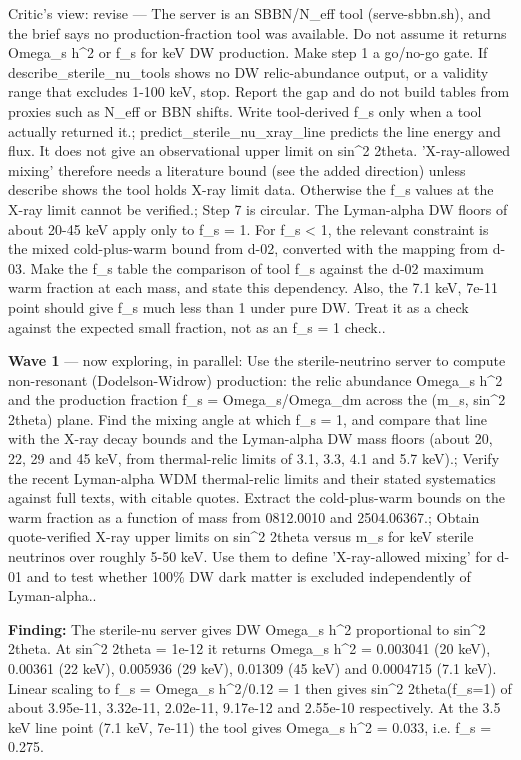 \documentclass[11pt,a4paper]{article}
\begin{document}
\begin{enumerate}
Critic's view: revise --- The server is an SBBN/N\_eff tool (serve-sbbn.sh), and the brief says no production-fraction tool was available. Do not assume it returns Omega\_s h\textasciicircum{}2 or f\_s for keV DW production. Make step 1 a go/no-go gate. If describe\_sterile\_nu\_tools shows no DW relic-abundance output, or a validity range that excludes 1-100 keV, stop. Report the gap and do not build tables from proxies such as N\_eff or BBN shifts. Write tool-derived f\_s only when a tool actually returned it.; predict\_sterile\_nu\_xray\_line predicts the line energy and flux. It does not give an observational upper limit on sin\textasciicircum{}2 2theta. 'X-ray-allowed mixing' therefore needs a literature bound (see the added direction) unless describe shows the tool holds X-ray limit data. Otherwise the f\_s values at the X-ray limit cannot be verified.; Step 7 is circular. The Lyman-alpha DW floors of about 20-45 keV apply only to f\_s = 1. For f\_s \textless{} 1, the relevant constraint is the mixed cold-plus-warm bound from d-02, converted with the mapping from d-03. Make the f\_s table the comparison of tool f\_s against the d-02 maximum warm fraction at each mass, and state this dependency. Also, the 7.1 keV, 7e-11 point should give f\_s much less than 1 under pure DW. Treat it as a check against the expected small fraction, not as an f\_s = 1 check..

\end{enumerate}
\textbf{Wave 1} --- now exploring, in parallel: Use the sterile-neutrino server to compute non-resonant (Dodelson-Widrow) production: the relic abundance Omega\_s h\textasciicircum{}2 and the production fraction f\_s = Omega\_s/Omega\_dm across the (m\_s, sin\textasciicircum{}2 2theta) plane. Find the mixing angle at which f\_s = 1, and compare that line with the X-ray decay bounds and the Lyman-alpha DW mass floors (about 20, 22, 29 and 45 keV, from thermal-relic limits of 3.1, 3.3, 4.1 and 5.7 keV).; Verify the recent Lyman-alpha WDM thermal-relic limits and their stated systematics against full texts, with citable quotes. Extract the cold-plus-warm bounds on the warm fraction as a function of mass from 0812.0010 and 2504.06367.; Obtain quote-verified X-ray upper limits on sin\textasciicircum{}2 2theta versus m\_s for keV sterile neutrinos over roughly 5-50 keV. Use them to define 'X-ray-allowed mixing' for d-01 and to test whether 100\% DW dark matter is excluded independently of Lyman-alpha..

\textbf{Finding:} The sterile-nu server gives DW Omega\_s h\textasciicircum{}2 proportional to sin\textasciicircum{}2 2theta. At sin\textasciicircum{}2 2theta = 1e-12 it returns Omega\_s h\textasciicircum{}2 = 0.003041 (20 keV), 0.00361 (22 keV), 0.005936 (29 keV), 0.01309 (45 keV) and 0.0004715 (7.1 keV). Linear scaling to f\_s = Omega\_s h\textasciicircum{}2/0.12 = 1 then gives sin\textasciicircum{}2 2theta(f\_s=1) of about 3.95e-11, 3.32e-11, 2.02e-11, 9.17e-12 and 2.55e-10 respectively. At the 3.5 keV line point (7.1 keV, 7e-11) the tool gives Omega\_s h\textasciicircum{}2 = 0.033, i.e. f\_s = 0.275.
\end{document}
